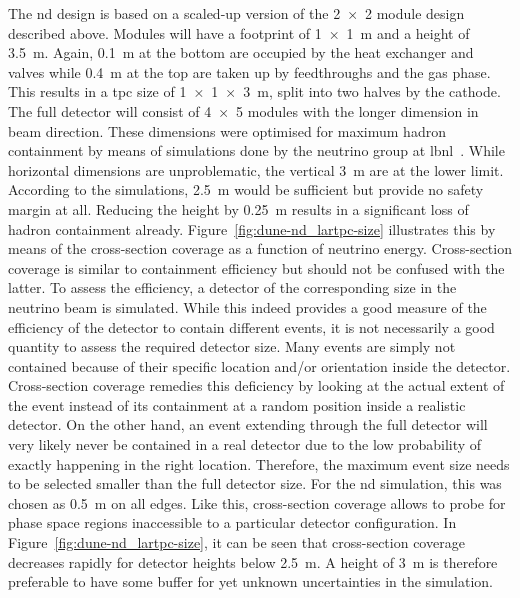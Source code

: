 The \AC{} \gls{nd} design is based on a scaled-up version of the \num{2 x 2} module design described above.
Modules will have a footprint of \SI{1 x 1}{\metre} and a height of \SI{3.5}{\metre}.
Again, \SI{0.1}{\metre} at the bottom are occupied by the heat exchanger and valves while \SI{0.4}{\metre} at the top are taken up by feedthroughs and the gas phase.
This results in a \gls{tpc} size of \SI{1 x 1 x 3}{\metre}, split into two halves by the cathode.
The full detector will consist of \num{4 x 5} modules with the longer dimension in beam direction.
These dimensions were optimised for maximum hadron containment by means of simulations done by the neutrino group at \gls{lbnl}~\cite{lartpcSizeChris}.
While horizontal dimensions are unproblematic, the vertical \SI{3}{\metre} are at the lower limit.
According to the simulations, \SI{2.5}{\metre} would be sufficient but provide no safety margin at all.
Reducing the height by \SI{0.25}{\metre} results in a significant loss of hadron containment already.
Figure~\ref{fig:dune-nd_lartpc-size} illustrates this by means of the cross-section coverage as a function of neutrino energy.
Cross-section coverage is similar to containment efficiency but should not be confused with the latter.
To assess the efficiency, a detector of the corresponding size in the neutrino beam is simulated.
While this indeed provides a good measure of the efficiency of the detector to contain different events, it is not necessarily a good quantity to assess the required detector size.
Many events are simply not contained because of their specific location and/or orientation inside the detector.
Cross-section coverage remedies this deficiency by looking at the actual extent of the event instead of its containment at a random position inside a realistic detector.
On the other hand, an event extending through the full detector will very likely never be contained in a real detector due to the low probability of exactly happening in the right location.
Therefore, the maximum event size needs to be selected smaller than the full detector size.
For the \gls{nd} simulation, this was chosen as \SI{0.5}{\metre} on all edges.
Like this, cross-section coverage allows to probe for phase space regions inaccessible to a particular detector configuration.
In Figure~\ref{fig:dune-nd_lartpc-size}, it can be seen that cross-section coverage decreases rapidly for detector heights below \SI{2.5}{\metre}.
A height of \SI{3}{\metre} is therefore preferable to have some buffer for yet unknown uncertainties in the simulation.

